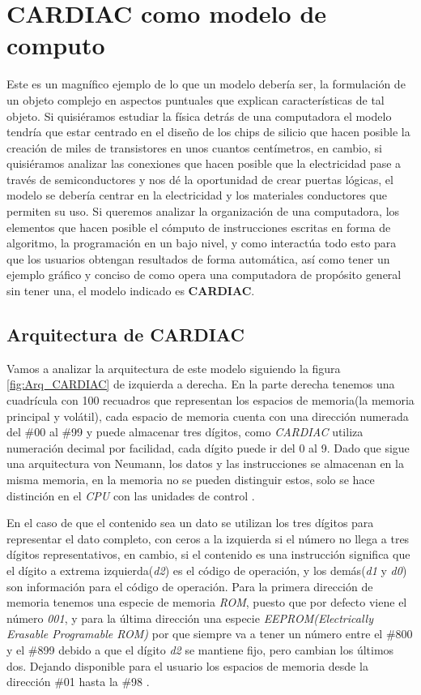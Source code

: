 \documentclass[letterpaper,12pt,oneside]{book}
\begin{document}
	\clearpage			
	
	\section{CARDIAC como modelo de computo}
	
	Este es un magnífico ejemplo de lo que un modelo debería ser, la formulación de un objeto complejo en aspectos puntuales que explican características de tal objeto.
 Si quisiéramos estudiar la física detrás de una computadora el modelo tendría que estar centrado
	en el diseño de los chips de silicio que hacen posible la creación de miles de transistores en unos cuantos centímetros, en cambio, si quisiéramos 
	analizar las conexiones que hacen posible que la electricidad pase a través de semiconductores y nos dé la oportunidad de crear puertas lógicas,
	el modelo se debería centrar en la electricidad y los materiales conductores que permiten su uso. Si queremos analizar la organización
	de una computadora, los elementos que hacen posible el cómputo de instrucciones escritas en forma de algoritmo, la programación
	en un bajo nivel, y como interactúa todo esto para que los usuarios obtengan resultados de forma automática, así como tener un ejemplo gráfico y 	
	conciso de como opera una computadora
	de propósito general sin tener una, el modelo indicado es \textbf{CARDIAC}.
	
	\subsection{Arquitectura de CARDIAC}	
	
	Vamos a analizar la arquitectura de este modelo siguiendo la figura \ref{fig:Arq_CARDIAC} de izquierda a derecha. En la parte
	derecha tenemos una cuadrícula con 100 recuadros que representan los espacios de memoria(la memoria principal y volátil),
	cada espacio de memoria cuenta con una dirección numerada del \#00 al \#99 y puede almacenar tres dígitos, como \textit{CARDIAC} utiliza
	numeración decimal por facilidad, cada dígito puede ir del 0 al 9. Dado que sigue una arquitectura von Neumann, los datos
	y las instrucciones se almacenan en la misma memoria, en la memoria no se pueden distinguir estos, solo se hace distinción en
	el \textit{CPU} con las unidades de control \cite{hegelbarger_instruction_1968}.
	
	En el caso de que el contenido sea un dato se utilizan los tres dígitos para representar el dato completo, con ceros a la 	
	izquierda si el número no llega a tres dígitos representativos, en cambio, si el contenido es una instrucción significa que el dígito a extrema 
	izquierda(\textit{d2})
	es el código de operación, y los demás(\textit{d1} y \textit{d0}) son información para el código de operación. Para la primera dirección de memoria 
	tenemos una especie de memoria \textit{ROM}, puesto
	que por defecto viene el número \textit{001}, y para la última dirección una especie \textit{EEPROM(Electrically Erasable Programable ROM)} por
	que siempre va a tener un número entre el \#800 y el \#899 debido a que el dígito \textit{d2} se mantiene fijo, pero cambian los últimos 
	dos. Dejando disponible para el usuario los espacios de memoria desde la dirección \#01 hasta la \#98 \cite{hegelbarger_instruction_1968}.
	
\end{document}
